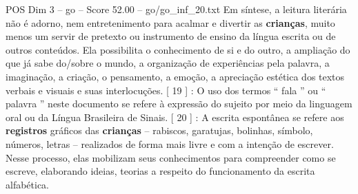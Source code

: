 \begin{textsample}{POS Dim 3 – go – Score 52.00 – go/go\_inf\_20.txt}
Em síntese, a leitura literária não é adorno, nem entretenimento para acalmar e divertir as \textbf{crianças}, muito menos um servir de pretexto ou instrumento de ensino da língua escrita ou de outros conteúdos.
Ela possibilita o conhecimento de si e do outro, a ampliação do que já sabe do/sobre o mundo, a organização de experiências pela palavra, a imaginação, a criação, o pensamento, a emoção, a apreciação estética dos textos verbais e visuais e suas interlocuções. [ 19 ] : O uso dos termos “ fala ” ou “ palavra ” neste documento se refere à expressão do sujeito por meio da linguagem oral ou da Língua Brasileira de Sinais. [ 20 ] : A escrita espontânea se refere aos \textbf{registros} gráficos das \textbf{crianças} – rabiscos, garatujas, bolinhas, símbolo, números, letras – realizados de forma mais livre e com a intenção de escrever.
Nesse processo, elas mobilizam seus conhecimentos para compreender como se escreve, elaborando ideias, teorias a respeito do funcionamento da escrita alfabética.

\end{textsample}
